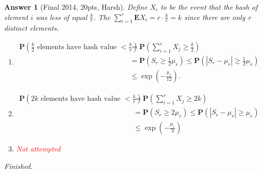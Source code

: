 \documentclass[11pt]{article}
\theoremstyle{numberplain}
\theoremstyle{nonumberplain}
\newtheorem{ans}{Answer}
\newcommand{\0}{{\mathbf{0}}}
\newcommand{\E}{{\mathbf{E}}}
\renewcommand{\P}{{\mathbf{P}}}
\begin{document}
\begin{ans}[Final 2014, 20pts, Harsh]
Define $X_i$ to be the event that the hash of element $i$ was less of equal $\frac{k}{r}$. The $\sum_{i=1}^{r} \E X_i = r\cdot \frac{k}{r} = k $ since there are only r distinct elements.


\begin{enumerate}
\item \begin{eqnarray*}
\P\left(\frac{k}{2}\text{ elements have hash value }<\frac{k}{r} \right) && = \P\left(\sum_{i=1}^rX_j\geq \frac{k}{2} \right) \\
&& = \P\left(S_r \geq \frac{1}{2}\mu_r \right)  \leq   \P\left(|S_r-\mu_r| \geq \frac{1}{2}\mu_r \right)  \\
&& \leq \exp\left(  -\frac{\mu_r}{12}  \right).
\end{eqnarray*}
\item \begin{eqnarray*}
\P\left(2k \text{ elements have hash value }<\frac{k}{r} \right) && = \P\left(\sum_{i=1}^rX_j\geq 2k \right) \\
&& = \P\left(S_r \geq 2\mu_r \right)  \leq   \P\left(|S_r-\mu_r| \geq \mu_r \right)  \\
&& \leq \exp\left(  -\frac{\mu_r}{3}  \right)
\end{eqnarray*}
\item \textcolor{red}{Not attempted}
\end{enumerate}
Finished.
\end{ans}
\end{document}
